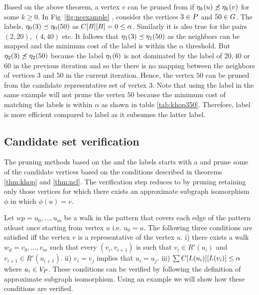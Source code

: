 Based on the above theorem, a vertex $v$ can be pruned from 
\CR if $\eta_{k}(u) \not\preceq \eta_{k}(v)$
for some $k \geq 0$. In Fig~\ref{fig:ncexample} , consider the vertices
$3 \in P$ and $50 \in G$. The \ncl labels, 
$\eta_{0}(3) \preceq \eta_{0}(50)$ as ${C}[B][B] = 0 \leq \alpha$.
Similarly it is also true for the pairs $(2, 20)$, $(4, 40)$ etc. It follows
that $\eta_{1}(3) \preceq \eta_{1}(50)$ as the neighbors can be mapped and
the minimum cost of the \khop label is within the $\alpha$ threshold. But
$\eta_{2}(3) \not\preceq \eta_{2}(50)$ because the \ncl label
$\eta_{1}(6)$ is not dominated by the \ncl label
of $20, 40$ or  $60$ in the previous iteration and so the
there is no mapping between the neighbors of vertices $3$ and 
$50$ in the current iteration. Hence, the vertex $50$
can be pruned from the candidate representative set of vertex $3$.
Note that using the \khop label in the same example will not prune the
vertex $50$ because the minimum cost of matching the \khop labels is within
$\alpha$ as shown in table \ref{tab:khop350}. Therefore, \ncl label is more
efficient compared to \khop label as it subsumes the latter label.

\subsection{Candidate set verification}
\label{sec:verification}
The pruning methods based on the \khop and the \ncl labels starts with a
\CR and prune some of the candidate vertices
based on the conditions described in theorems \ref{thm:khop} and \ref{thm:ncl}.
The verification step reduces \CR to \RS by pruning retaining only those vertices
for which there exists an approximate subgraph isomorphism $\phi$ in which $\phi(u) = v$.

Let $wp = u_0,\ldots, u_m$ be a walk in the pattern that covers each
edge of the pattern atleast once starting from vertex $u$ i.e. $u_0 = u$.
The following three conditions are satisfied iff the vertex $v$ is a
representative of the vertex $u$. i) there exists a walk $w_d = v_0,\ldots, v_m$
such that every $(v_i, v_{i+1})$ is such that $v_i \in R'(u_i)$ and
$v_{i+1} \in R'(u_{i+1})$. ii) $v_i = v_j$ implies that $u_i = u_j$. iii) 
$\sum{C}[L(u_i)][L(v_i)] \leq \alpha$ where $u_i \in V_P$. These 
conditions can be verified by following the definition of approximate
subgraph isomorphism. Using an example we will show how these conditions
are verified.

